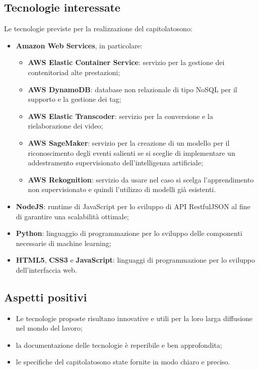 \subsection{Tecnologie interessate}
Le tecnologie previste per la realizzazione del capitolato\glosp sono:
\begin{itemize}
	\item \textbf{Amazon Web Services}\glo, in particolare:
	\begin{itemize}
		\item \textbf{AWS Elastic Container Service}: servizio per la gestione dei contenitori\glosp ad alte prestazioni;
		\item \textbf{AWS DynamoDB}: database non relazionale di tipo NoSQL per il supporto e la gestione dei tag;
		\item \textbf{AWS Elastic Transcoder}: servizio per la conversione e la rielaborazione dei video;
		\item \textbf{AWS SageMaker}: servizio per la creazione di un modello per il riconoscimento degli eventi salienti se si sceglie di implementare un addestramento supervisionato dell'intelligenza artificiale\glo;
		\item \textbf{AWS Rekognition}: servizio da usare nel caso si scelga l'apprendimento non supervisionato e quindi l'utilizzo di modelli già esistenti.
	\end{itemize}
	\item \textbf{NodeJS}: runtime di JavaScript per lo sviluppo di API Restful\glosp JSON al fine di garantire una scalabilità ottimale;
	\item \textbf{Python}: linguaggio di programmazione per lo sviluppo delle componenti necessarie di machine learning\glo;
	\item \textbf{HTML5}, \textbf{CSS3} e \textbf{JavaScript}: linguaggi di programmazione per lo sviluppo dell'interfaccia web. 
\end{itemize}
\subsection{Aspetti positivi}
\begin{itemize}
	\item Le tecnologie proposte risultano innovative e utili per la loro larga diffusione nel mondo del lavoro;
	\item la documentazione delle tecnologie è reperibile e ben approfondita;
	\item le specifiche del capitolato\glosp sono state fornite in modo chiaro e preciso. 
\end{itemize}
